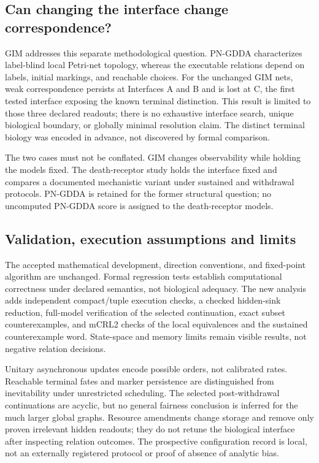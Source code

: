 \subsection{Can changing the interface change correspondence?}

GIM addresses this separate methodological question. PN-GDDA characterizes
label-blind local Petri-net topology,\cite{Szawulak2022} whereas the executable
relations depend on labels, initial markings, and reachable choices. For the
unchanged GIM nets, weak correspondence persists at Interfaces A and B and
is lost at C, the first tested interface exposing the known terminal
distinction. This result is limited to those three declared readouts; there is
no exhaustive interface search, unique biological boundary, or globally minimal
resolution claim. The distinct terminal biology was encoded in advance, not
discovered by formal comparison.

The two cases must not be conflated. GIM changes observability while holding
the models fixed. The death-receptor study holds the interface fixed and
compares a documented mechanistic variant under sustained and withdrawal
protocols. PN-GDDA is retained for the former structural question; no uncomputed
PN-GDDA score is assigned to the death-receptor models.

\subsection{Validation, execution assumptions and limits}

The accepted mathematical development, direction conventions, and fixed-point
algorithm are unchanged. Formal regression tests establish computational
correctness under declared semantics, not biological adequacy. The new analysis
adds independent compact/tuple execution checks, a checked hidden-sink
reduction, full-model verification of the selected continuation, exact subset
counterexamples, and mCRL2 checks of the local equivalences and the sustained
counterexample word. State-space and
memory limits remain visible results, not negative relation decisions.

Unitary asynchronous updates encode possible orders, not calibrated rates.
Reachable terminal fates and marker persistence are distinguished from
inevitability under unrestricted scheduling. The selected post-withdrawal
continuations are acyclic, but no general fairness conclusion is inferred for
the much larger global graphs. Resource amendments change storage and remove
only proven irrelevant hidden readouts; they do not retune the biological
interface after inspecting relation outcomes. The prospective configuration
record is local, not an externally registered protocol or proof of absence
of analytic bias.

